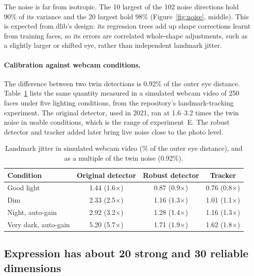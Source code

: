\documentclass[11pt,a4paper]{article}
\begin{document}
The noise is far from isotropic. The 10 largest of the 102 noise directions hold 90\% of its
variance and the 20 largest hold 98\% (Figure~\ref{fig:noise}, middle). This is expected from
dlib's design: its regression trees add up shape corrections learnt from training faces, so its
errors are correlated whole-shape adjustments, such as a slightly larger or shifted eye, rather
than independent landmark jitter.

\paragraph{Calibration against webcam conditions.} The difference between two twin detections is
0.92\% of the outer eye distance. Table~\ref{tab:webcam} lists the same quantity measured in a
simulated webcam video of 250 faces under five lighting conditions, from the repository's
landmark-tracking experiment. The original detector, used in 2021, ran at 1.6--3.2 times the twin
noise in usable conditions, which is the range of experiment~E. The robust detector and tracker
added later bring live noise close to the photo level.

\begin{table}[h]
  \centering\small
  \caption{Landmark jitter in simulated webcam video (\% of the outer eye distance), and as a
  multiple of the twin noise (0.92\%).}\label{tab:webcam}
  \begin{tabular}{lccc}
    \toprule
    Condition & Original detector & Robust detector & Tracker \\
    \midrule
    Good light & 1.44 (1.6$\times$) & 0.87 (0.9$\times$) & 0.76 (0.8$\times$) \\
    Dim & 2.33 (2.5$\times$) & 1.16 (1.3$\times$) & 1.01 (1.1$\times$) \\
    Night, auto-gain & 2.92 (3.2$\times$) & 1.28 (1.4$\times$) & 1.16 (1.3$\times$) \\
    Very dark, auto-gain & 5.20 (5.7$\times$) & 1.71 (1.9$\times$) & 1.62 (1.8$\times$) \\
    \bottomrule
  \end{tabular}
\end{table}

\subsection{Expression has about 20 strong and 30 reliable dimensions}
\end{document}
